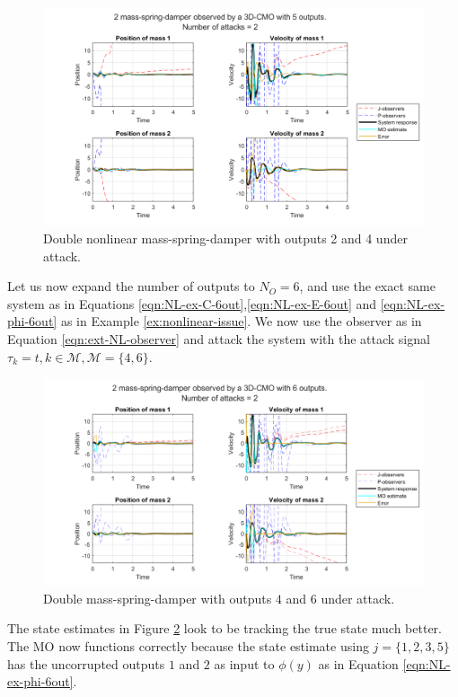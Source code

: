 \begin{example}
    \begin{figure}[H]
        \centering
        \includegraphics[width=\linewidth]{report/Figures/extended_nonlinear_not_functional.png}
        \caption{Double nonlinear mass-spring-damper with outputs 2 and 4 under attack.}
        \label{fig:extended_nonlinear_not_functional}
    \end{figure}
    Let us now expand the number of outputs to $N_O=6$, and use the exact same system as in Equations \eqref{eqn:NL-ex-C-6out},\eqref{eqn:NL-ex-E-6out} and \eqref{eqn:NL-ex-phi-6out} as in Example \ref{ex:nonlinear-issue}. We now use the observer as in Equation \eqref{eqn:ext-NL-observer} and attack the system with the attack signal $\tau_k=t,k \in \mathcal{M},\mathcal{M}=\{4,6\}$.
    \begin{figure}[H]
        \centering
        \includegraphics[width=\linewidth]{report/Figures/extended-nonlinear-functional.png}
        \caption{Double mass-spring-damper with outputs $4$ and $6$ under attack.}
        \label{fig:extended-nonlinear-functional}
    \end{figure}
    The state estimates in Figure \ref{fig:extended-nonlinear-functional} look to be tracking the true state much better. The MO now functions correctly because the state estimate using $j=\{1,2,3,5\}$ has the uncorrupted outputs $1$ and $2$ as input to $\phi(y)$ as in Equation \eqref{eqn:NL-ex-phi-6out}.
\end{example}
